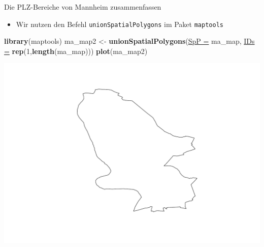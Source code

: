 \documentclass[ignorenonframetext,]{beamer}
\newenvironment{Shaded}{\begin{snugshade}}{\end{snugshade}}
\newcommand{\KeywordTok}[1]{\textcolor[rgb]{0.26,0.66,0.93}{\textbf{#1}}}
\newcommand{\DataTypeTok}[1]{\textcolor[rgb]{0.74,0.68,0.62}{\underline{#1}}}
\newcommand{\DecValTok}[1]{\textcolor[rgb]{0.27,0.67,0.26}{#1}}
\newcommand{\StringTok}[1]{\textcolor[rgb]{0.02,0.61,0.04}{#1}}
\newcommand{\NormalTok}[1]{\textcolor[rgb]{0.74,0.68,0.62}{#1}}
\providecommand{\tightlist}{%
  \setlength{\itemsep}{0pt}\setlength{\parskip}{0pt}}
\begin{document}
\begin{frame}[fragile]{Die PLZ-Bereiche von Mannheim zusammenfassen}

\begin{itemize}
\tightlist
\item
  Wir nutzen den Befehl \texttt{unionSpatialPolygons} im Paket
  \texttt{maptools}
\end{itemize}

\begin{Shaded}
\begin{Highlighting}[]
\KeywordTok{library}\NormalTok{(maptools)}
\NormalTok{ma_map2 <-}\StringTok{ }\KeywordTok{unionSpatialPolygons}\NormalTok{(}\DataTypeTok{SpP =}\NormalTok{ ma_map,}
                                \DataTypeTok{IDs =} \KeywordTok{rep}\NormalTok{(}\DecValTok{1}\NormalTok{,}\KeywordTok{length}\NormalTok{(ma_map)))}
\KeywordTok{plot}\NormalTok{(ma_map2)}
\end{Highlighting}
\end{Shaded}

\includegraphics{Geomedizin_files/figure-beamer/unnamed-chunk-140-1.pdf}

\end{frame}
\end{document}
